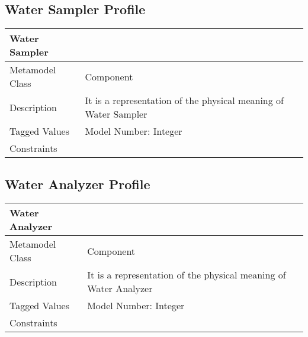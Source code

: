 \subsection{Water Sampler Profile}

\begin{longtable}{|p{7cm}|p{7cm}|}

\hline
\textbf{Water Sampler } & \\


\hline
Metamodel Class & Component\\

\hline
Description & It is a representation of the physical meaning of Water Sampler\\

\hline
Tagged Values & Model Number: Integer\\

\hline
Constraints &\\

\hline
\end{longtable}

\subsection{Water Analyzer Profile}

\begin{longtable}{|p{7cm}|p{7cm}|}

\hline
\textbf{Water Analyzer} & \\


\hline
Metamodel Class & Component\\

\hline
Description & It is a representation of the physical meaning of Water Analyzer\\

\hline
Tagged Values & Model Number: Integer\\

\hline
Constraints &\\

\hline
\end{longtable}